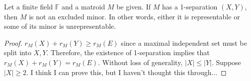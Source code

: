 \begin{lem}
Let a finite field $\mathbb{F}$ and a matroid $M$ be given.
If $M$ has a 1-separation $(X, Y)$, then $M$ is not an excluded minor.
In other words, either it is representable or some of its minor is unrepresentable.
\end{lem}

\begin{proof}
$r_M(X) + r_M(Y) \geq r_M(E)$ since a maximal independent set must be split into $X, Y$.
Therefore, the existence of 1-separation implies that $r_M(X) + r_M(Y) = r_M(E)$.
Without loss of generality, $\lvert X \rvert \leq \lvert Y \rvert$.
Suppose $\lvert X \rvert \geq 2$.
I think I can prove this, but I haven't thought this through...
\end{proof}


